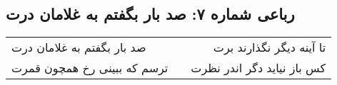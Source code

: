 \begin{center}
\section*{رباعی شماره ۷: صد بار بگفتم به غلامان درت}
\label{sec:007}
\begin{longtable}{l p{0.5cm} r}
صد بار بگفتم به غلامان درت
&&
تا آینه دیگر نگذارند برت
\\
ترسم که ببینی رخ همچون قمرت
&&
کس باز نیاید دگر اندر نظرت
\\
\end{longtable}
\end{center}
